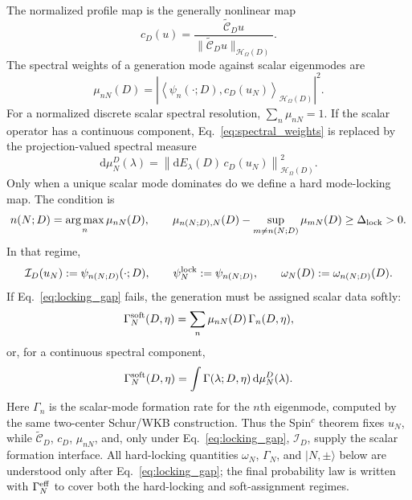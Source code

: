 \documentclass[aps,prd,preprint,notitlepage,nofootinbib,superscriptaddress,floatfix]{revtex4-2}
\newcommand{\dd}{\mathrm{d}}
\newcommand{\cH}{\mathcal H}
\theoremstyle{remark}
\begin{document}
The normalized profile map is the generally nonlinear map
\begin{equation}
\boxed{
c_D(u)
=
\frac{\widetilde{\mathcal C}_Du}
{\|\widetilde{\mathcal C}_Du\|_{\cH_\Omega(D)}}.
}
\label{eq:normalized_scalar_profile}
\end{equation}
The spectral weights of a generation mode against scalar eigenmodes are
\begin{equation}
\boxed{
\mu_{nN}(D)
=
\left|
\left\langle
\psi_n(\cdot;D),
c_D(u_N)
\right\rangle_{\cH_\Omega(D)}
\right|^2.
}
\label{eq:spectral_weights}
\end{equation}
For a normalized discrete scalar spectral resolution, \(\sum_n\mu_{nN}=1\).
If the scalar operator has a continuous component, Eq.~\eqref{eq:spectral_weights} is replaced by the projection-valued spectral measure
\begin{equation}
\dd\mu_N^D(\lambda)
=
\left\|
\dd E_\lambda(D)\,c_D(u_N)
\right\|_{\cH_\Omega(D)}^2.
\label{eq:spectral_measure}
\end{equation}
Only when a unique scalar mode dominates do we define a hard mode-locking map.
The condition is
\begin{equation}
n(N;D)
=
\operatorname*{arg\,max}_{n}\mu_{nN}(D),
\qquad
\mu_{n(N;D),N}(D)
-
\sup_{m\ne n(N;D)}\mu_{mN}(D)
\ge
\Delta_{\rm lock}>0.
\label{eq:locking_gap}
\end{equation}
In that regime,
\begin{equation}
\mathcal I_D(u_N):=\psi_{n(N;D)}(\cdot;D),
\qquad
\psi_N^{\rm lock}:=\psi_{n(N;D)},
\qquad
\omega_N(D):=\omega_{n(N;D)}(D).
\label{eq:hard_locking_map}
\end{equation}
If Eq.~\eqref{eq:locking_gap} fails, the generation must be assigned scalar data softly:
\begin{equation}
\Gamma_N^{\rm soft}(D,\eta)
=
\sum_n\mu_{nN}(D)\,\Gamma_n(D,\eta),
\label{eq:soft_rate_discrete}
\end{equation}
or, for a continuous spectral component,
\begin{equation}
\Gamma_N^{\rm soft}(D,\eta)
=
\int \Gamma(\lambda;D,\eta)\,\dd\mu_N^D(\lambda).
\label{eq:soft_rate_continuous}
\end{equation}
Here \(\Gamma_n\) is the scalar-mode formation rate for the \(n\)th eigenmode, computed by the same two-center Schur/WKB construction.
Thus the Spin\(^c\) theorem fixes \(u_N\), while \(\widetilde{\mathcal C}_D\), \(c_D\), \(\mu_{nN}\), and, only under Eq.~\eqref{eq:locking_gap}, \(\mathcal I_D\), supply the scalar formation interface.
All hard-locking quantities \(\omega_N\), \(\Gamma_N\), and \(|N,\pm\rangle\) below are understood only after Eq.~\eqref{eq:locking_gap}; the final probability law is written with \(\Gamma_N^{\rm eff}\) to cover both the hard-locking and soft-assignment regimes.
\end{document}
